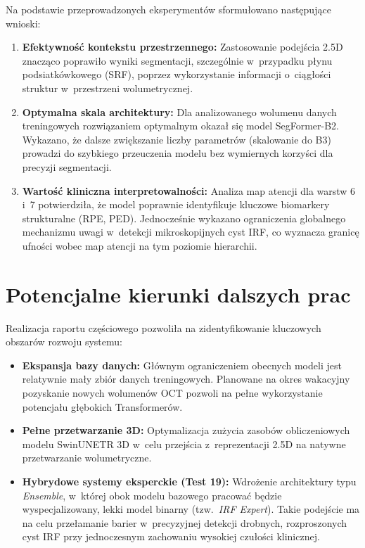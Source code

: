 \documentclass[12pt,a4paper,oneside]{report}
\begin{document}
Na podstawie przeprowadzonych eksperymentów sformułowano następujące wnioski:
\begin{enumerate}
 \item \textbf{Efektywność kontekstu przestrzennego:} Zastosowanie podejścia 2.5D znacząco poprawiło wyniki segmentacji, szczególnie w~przypadku płynu podsiatkówkowego (SRF), poprzez wykorzystanie informacji o~ciągłości struktur w~przestrzeni wolumetrycznej.
 \item \textbf{Optymalna skala architektury:} Dla analizowanego wolumenu danych treningowych rozwiązaniem optymalnym okazał się model SegFormer-B2. Wykazano, że dalsze zwiększanie liczby parametrów (skalowanie do B3) prowadzi do szybkiego przeuczenia modelu bez wymiernych korzyści dla precyzji segmentacji.
 \item \textbf{Wartość kliniczna interpretowalności:} Analiza map atencji dla warstw 6 i~7 potwierdziła, że model poprawnie identyfikuje kluczowe biomarkery strukturalne (RPE, PED). Jednocześnie wykazano ograniczenia globalnego mechanizmu uwagi w~detekcji mikroskopijnych cyst IRF, co wyznacza granicę ufności wobec map atencji na tym poziomie hierarchii.
\end{enumerate}

\section{Potencjalne kierunki dalszych prac}

Realizacja raportu częściowego pozwoliła na zidentyfikowanie kluczowych obszarów rozwoju systemu:
\begin{itemize}
 \item \textbf{Ekspansja bazy danych:} Głównym ograniczeniem obecnych modeli jest relatywnie mały zbiór danych treningowych. Planowane na okres wakacyjny pozyskanie nowych wolumenów OCT pozwoli na pełne wykorzystanie potencjału głębokich Transformerów.
 \item \textbf{Pełne przetwarzanie 3D:} Optymalizacja zużycia zasobów obliczeniowych modelu SwinUNETR 3D w~celu przejścia z~reprezentacji 2.5D na natywne przetwarzanie wolumetryczne.
 \item \textbf{Hybrydowe systemy eksperckie (Test 19):} Wdrożenie architektury typu \textit{Ensemble}, w~której obok modelu bazowego pracować będzie wyspecjalizowany, lekki model binarny (tzw.~\textit{IRF Expert}). Takie podejście ma na celu przełamanie barier w~precyzyjnej detekcji drobnych, rozproszonych cyst IRF przy jednoczesnym zachowaniu wysokiej czułości klinicznej.
\end{itemize}



\end{document}
